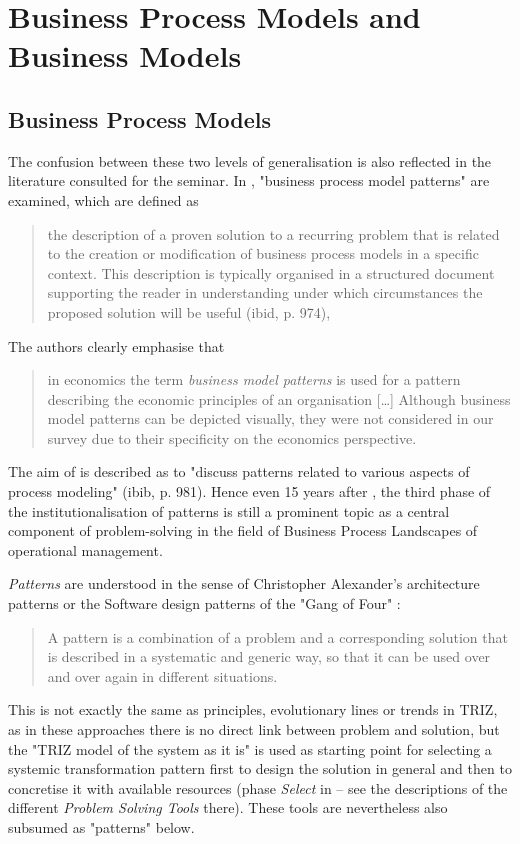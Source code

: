 \documentclass[11pt,a4paper]{article}
\begin{document}
\section{Business Process Models and Business Models}

\subsection{Business Process Models}

The confusion between these two levels of generalisation is also reflected in
the literature consulted for the seminar.  In \cite{Fellmann2018}, "business
process model patterns" are examined, which are defined as
\begin{quote}
  the description of a proven solution to a recurring problem that is related
  to the creation or modification of business process models in a specific
  context. This description is typically organised in a structured document
  supporting the reader in understanding under which circumstances the
  proposed solution will be useful (ibid, p. 974),
\end{quote}
The authors clearly emphasise that 
\begin{quote}
  in economics the term \emph{business model patterns} is used for a pattern
  describing the economic principles of an organisation [\ldots] Although
  business model patterns can be depicted visually, they were not considered
  in our survey due to their specificity on the economics perspective.
\end{quote}
The aim of \cite{Fellmann2018} is described as to "discuss patterns related to
various aspects of process modeling" (ibib, p. 981). Hence even 15 years after
\cite{Smith2006}, the third phase of the institutionalisation of patterns is
still a prominent topic as a central component of problem-solving in the field
of Business Process Landscapes of operational management.

\emph{Patterns} are understood in the sense of Christopher Alexander's
architecture patterns \cite{Alexander} or the Software design patterns of the
"Gang of Four" \cite{Gamma}:  
\begin{quote}
  A pattern is a combination of a problem and a corresponding solution that is
  described in a systematic and generic way, so that it can be used over and
  over again in different situations. \cite[p. 3]{LF2018}
\end{quote}

This is not exactly the same as principles, evolutionary lines or trends in
TRIZ, as in these approaches there is no direct link between problem and
solution, but the "TRIZ model of the system as it is" is used as starting
point for selecting a systemic transformation pattern first to design the
solution in general and then to concretise it with available resources (phase
\emph{Select} in \cite{Mann} -- see the descriptions of the different
\emph{Problem Solving Tools} there).  These tools are nevertheless also
subsumed as "patterns" below.
\end{document}
